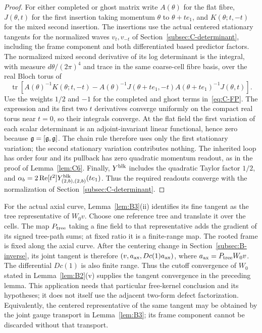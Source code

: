 \begin{proof}
For either completed or ghost matrix write $A(\theta)$ for the flat fibre, $J(\theta,t)$ for the first insertion taking momentum $\theta$ to $\theta+t e_1$, and $K(\theta;t,-t)$ for the mixed second insertion. The insertions use the actual centered stationary tangents for the normalized waves $v_t,v_{-t}$ of Section~\ref{subsec:C-determinant}, including the frame component and both differentiated based predictor factors. The normalized mixed second derivative of its log determinant is the integral, with measure $d\theta/(2\pi)^4$ and trace in the same coarse-cell fibre basis, over the real Bloch torus of
\[
 \operatorname{tr}\!\left[A(\theta)^{-1}K(\theta;t,-t)
 -A(\theta)^{-1}J(\theta+t e_1,-t)
 A(\theta+t e_1)^{-1}J(\theta,t)\right].
\]
Use the weights $1/2$ and $-1$ for the completed and ghost terms in~\eqref{eq:C-FP}. The expression and its first two $t$ derivatives converge uniformly on the compact real torus near $t=0$, so their integrals converge. At the flat field the first variation of each scalar determinant is an adjoint-invariant linear functional, hence zero because $\mathfrak{g}=[\mathfrak{g},\mathfrak{g}]$. The chain rule therefore uses only the first stationary variation; the second stationary variation contributes nothing. The inherited loop has order four and its pullback has zero quadratic momentum readout, as in the proof of Lemma~\ref{lem:C6}. Finally, $Y^{\rm blk}$ includes the quadratic Taylor factor $1/2$, and $\alpha_b=2\operatorname{Re}[t^2]Y^{\rm blk}_{(2,b),(2,b)}(te_1)$. Thus the required readouts converge with the normalization of Section~\ref{subsec:C-determinant}.
\end{proof}

For the actual axial curve, Lemma~\ref{lem:B3}(ii) identifies its fine tangent as the tree representative of $W_0v$. Choose one reference tree and translate it over the cells. The map $P_{\rm tree}$ taking a fine field to that representative adds the gradient of its signed tree-path sums; at fixed ratio it is a finite-range map. The rooted frame is fixed along the axial curve. After the centering change in Section~\ref{subsec:B-inverse}, its joint tangent is therefore $(v,a_{\rm ax},Dc(1)a_{\rm ax})$, where $a_{\rm ax}=P_{\rm tree}W_0v$. The differential $Dc(1)$ is also finite range. Thus the cutoff convergence of $W_0$ stated in Lemma~\ref{lem:B2}(v) supplies the tangent convergence in the preceding lemma. This application needs that particular free-kernel conclusion and its hypotheses; it does not itself use the adjacent two-form defect factorization. Equivalently, the centered representative of the same tangent may be obtained by the joint gauge transport in Lemma~\ref{lem:B3}; its frame component cannot be discarded without that transport.

